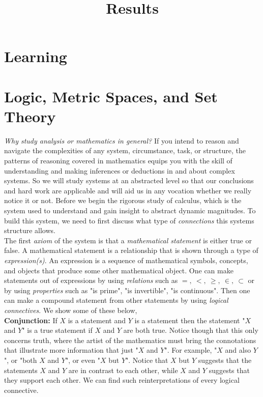 \documentclass{article}
\title{Results}
\theoremstyle{definition}
\theoremstyle{remark}
\begin{document}
\maketitle

\tableofcontents

\section{Learning}




\section{Logic, Metric Spaces, and Set Theory}




\indent \textit{Why study analysis or mathematics in general?} If you intend to reason and navigate the complexities of any system, circumstance, task, or structure, the patterns of reasoning covered in mathematics equips you with the skill of understanding and making inferences or deductions in and about complex systems. So we will study systems at an abstracted level so that our conclusions and hard work are applicable and will aid us in any vocation whether we really notice it or not.  
\indent Before we begin the rigorous study of calculus, which is the system used to understand and gain insight to abstract dynamic magnitudes. To build this system, we need to first discuss what type of \textit{connections} this systems structure allows. \\
\indent The first \textit{axiom} of the system is that a \textit{mathematical statement} is either true or false. A mathematical statement is a relationship that is shown through a type of \textit{expression(s)}. An expression is a sequence of mathematical symbols, concepts, and objects that produce some other mathematical object. One can make statements out of expressions by using \textit{relations} such as  \(=, \ <, \ \geq, \ \in, \ \subset \) or by using \textit{properties} such as "is prime", "is invertible", "is continuous". Then one can make a compound statement from other statements by using \textit{logical connectives}. We show some of these below, \\
\textbf{Conjunction:} If \(X\) is a statement and $Y$ is a statement then the statement "$X$ and $Y$" is a true statement if $X$ and $Y$ are both true. Notice though that this only concerns truth, where the artist of the mathematics must bring the connotations that illustrate more information that just "$X$ and $Y$". For example, "$X$ and also $Y$", or "both $X$ and $Y$", or even "$X$ but $Y$". Notice that $X$ but $Y$ suggests that the statements $X$ and $Y$ are in contrast to each other, while $X$ and $Y$ suggests that they support each other. We can find such reinterpretations of every logical connective.\\
\end{document}
